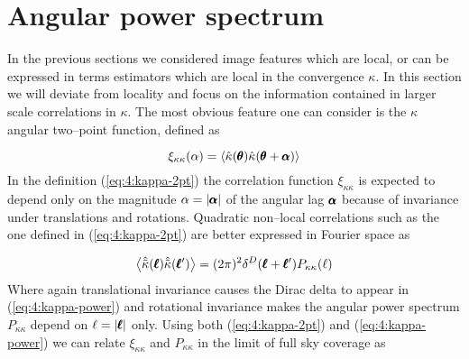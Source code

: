 
\section{Angular power spectrum}
\label{sec:4:power}
In the previous sections we considered image features which are local, or can be expressed in terms estimators which are local in the convergence $\kappa$. In this section we will deviate from locality and focus on the information contained in larger scale correlations in $\kappa$. The most obvious feature one can consider is the $\kappa$ angular two--point function, defined as 

\begin{equation}
\label{eq:4:kappa-2pt}
\xi_{\kappa\kappa}(\alpha) = \langle\hat{\kappa}(\pmb{\theta})\hat{\kappa}(\pmb{\theta}+\pmb{\alpha})\rangle 
\end{equation} 
%
In the definition (\ref{eq:4:kappa-2pt}) the correlation function $\xi_{\kappa\kappa}$ is expected to depend only on the magnitude $\alpha=\vert\pmb{\alpha}\vert$ of the angular lag $\pmb{\alpha}$ because of invariance under translations and rotations. Quadratic non--local correlations such as the one defined in (\ref{eq:4:kappa-2pt}) are better expressed in Fourier space as

\begin{equation}
\label{eq:4:kappa-power}
\left\langle\hat{\tilde{\kappa}}(\pmb{\ell})\hat{\tilde{\kappa}}(\pmb{\ell}')\right\rangle = (2\pi)^2 \delta^D(\pmb{\ell}+\pmb{\ell}')P_{\kappa\kappa}(\ell)
\end{equation}
%
Where again translational invariance causes the Dirac delta to appear in (\ref{eq:4:kappa-power}) and rotational invariance makes the angular power spectrum $P_{\kappa\kappa}$ depend on $\ell=\vert\pmb{\ell}\vert$ only. Using both (\ref{eq:4:kappa-2pt}) and (\ref{eq:4:kappa-power}) we can relate $\xi_{\kappa\kappa}$ and $P_{\kappa\kappa}$ in the limit of full sky coverage as 

